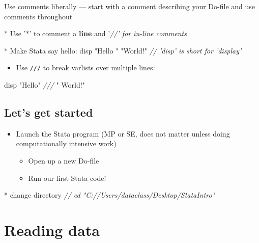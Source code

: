 \documentclass[
]{book}
\newenvironment{Shaded}{\begin{snugshade}}{\end{snugshade}}
\newcommand{\CommentTok}[1]{\textcolor[rgb]{0.56,0.35,0.01}{\textit{#1}}}
\newcommand{\KeywordTok}[1]{\textcolor[rgb]{0.13,0.29,0.53}{\textbf{#1}}}
\newcommand{\NormalTok}[1]{#1}
\newcommand{\StringTok}[1]{\textcolor[rgb]{0.31,0.60,0.02}{#1}}
\providecommand{\tightlist}{%
  \setlength{\itemsep}{0pt}\setlength{\parskip}{0pt}}
\begin{document}
Use comments liberally --- start with a comment describing your Do-file and use comments throughout

\begin{Shaded}
\begin{Highlighting}[]
\NormalTok{* Use '*' to comment a }\KeywordTok{line}\NormalTok{ and '}\CommentTok{//' for in-line comments}

\NormalTok{* Make Stata say hello:}
\NormalTok{disp }\StringTok{"Hello "} \StringTok{"World!"} \CommentTok{// 'disp' is short for 'display'}
\end{Highlighting}
\end{Shaded}

\begin{itemize}
\tightlist
\item
  Use \texttt{///} to break varlists over multiple lines:
\end{itemize}

\begin{Shaded}
\begin{Highlighting}[]
\NormalTok{disp }\StringTok{"Hello"} \CommentTok{///}
     \StringTok{" World!"}
\end{Highlighting}
\end{Shaded}

\hypertarget{lets-get-started}{%
\subsection{Let's get started}\label{lets-get-started}}

\begin{itemize}
\tightlist
\item
  Launch the Stata program (MP or SE, does not matter unless doing computationally intensive work)

  \begin{itemize}
  \tightlist
  \item
    Open up a new Do-file
  \item
    Run our first Stata code!
  \end{itemize}
\end{itemize}

\begin{Shaded}
\begin{Highlighting}[]
\NormalTok{* change directory}
\CommentTok{// cd "C://Users/dataclass/Desktop/StataIntro"}
\end{Highlighting}
\end{Shaded}

\hypertarget{reading-data-2}{%
\section{Reading data}\label{reading-data-2}}
\end{document}
